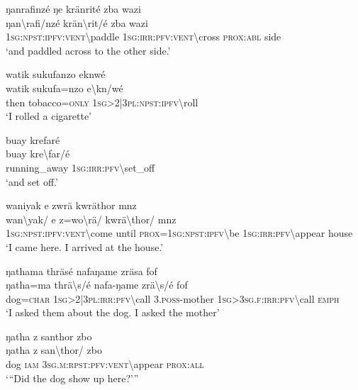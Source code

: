 \ea\label{ex:13:a1442}
ŋanrafinzé ŋe kränrité zba wazi\\
\gll ŋan{\textbackslash}rafi/nzé	krän{\textbackslash}rit/é	zba	wazi\\
     1\textsc{sg}:\textsc{npst}:\textsc{ipfv}:\textsc{vent}{\textbackslash}paddle	1\textsc{sg}:\textsc{irr}:\textsc{pfv}:\textsc{vent}{\textbackslash}cross	\textsc{prox}:\textsc{abl}	side\\
\glt `and paddled across to the other side.'
\z

\ea\label{ex:13:a1443}
watik sukufanzo eknwé\\
\gll watik	sukufa=nzo	e{\textbackslash}kn/wé\\
     then	tobacco=\textsc{only}	1\textsc{sg}>2|3\textsc{pl}:\textsc{npst}:\textsc{ipfv}{\textbackslash}roll\\
\glt `I rolled a cigarette'
\z

\ea\label{ex:13:a1445}
buay krefaré\\
\gll buay	kre{\textbackslash}far/é\\
     running\_away	1\textsc{sg}:\textsc{irr}:\textsc{pfv}{\textbackslash}set\_off\\
\glt `and set off.'
\z

\ea\label{ex:13:a1446}
waniyak e zwrä kwräthor mnz\\
\gll wan{\textbackslash}yak/	e	z=wo{\textbackslash}rä/	kwrä{\textbackslash}thor/	mnz\\
     1\textsc{sg}:\textsc{npst}:\textsc{ipfv}:\textsc{vent}{\textbackslash}come	until	\textsc{prox}=1\textsc{sg}:\textsc{npst}:\textsc{ipfv}{\textbackslash}be	1\textsc{sg}:\textsc{irr}:\textsc{pfv}{\textbackslash}appear	house\\
\glt `I came here. I arrived at the house.'
\z

\ea\label{ex:13:a1448}
ŋathama thräsé nafaŋame zräsa fof\\
\gll ŋatha=ma	thrä{\textbackslash}s/é	nafa-ŋame	zrä{\textbackslash}s/é	fof\\
     dog=\textsc{char}	1\textsc{sg}>2|3\textsc{pl}:\textsc{irr}:\textsc{pfv}{\textbackslash}call	3.\textsc{poss}-mother	1\textsc{sg}>3\textsc{sg}.\textsc{f}:\textsc{irr}:\textsc{pfv}{\textbackslash}call	\textsc{emph}\\
\glt `I asked them about the dog. I asked the mother'
\z

\ea\label{ex:13:a1449}
ŋatha z santhor zbo\\
\gll ŋatha	z	san{\textbackslash}thor/	zbo\\
     dog	\textsc{iam}	3\textsc{sg}.\textsc{m}:\textsc{rpst}:\textsc{pfv}:\textsc{vent}{\textbackslash}appear	\textsc{prox}:\textsc{all}\\
\glt `{``}Did the dog show up here?'''
\z

